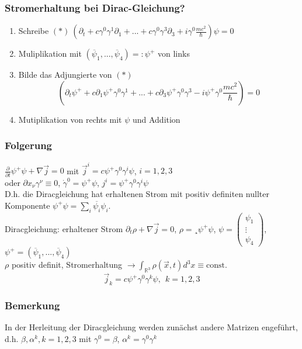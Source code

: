 \documentclass[twoside,a4paper]{scrartcl}
\newcommand{\R}{\mathbb{R}}
\renewcommand{\1}{\mathds{1}}
\newcommand{\ra}{\rightarrow}
\renewcommand{\R}{\mathbb{R}}
\begin{document}
\subsubsection*{Stromerhaltung bei Dirac-Gleichung?}
\begin{enumerate}
\item Schreibe $(*) \ (\partial_t+c\gamma^0\gamma^1 \partial_1+...+c\gamma^0\gamma^3 \partial_3+i\gamma^0\frac{mc^2}{\hbar})\psi=0$
\item Muliplikation mit $(\overline{\psi}_1,...,\overline{\psi}_4)=:\psi^+$ von links
\item Bilde das Adjungierte von $(*)$ 
$$(\partial_t \psi^++c\partial_1\psi^+\gamma^0\gamma^1 +...+c\partial_3\psi^+\gamma^0\gamma^3 -i\psi^+\gamma^0\frac{mc^2}{\hbar})=0$$
\item Mutiplikation von rechts mit $\psi$ und Addition
\end{enumerate}
\subsubsection*{Folgerung}
$\frac{\partial}{\partial t} \psi^+\psi+\nabla \vec j=0$ mit $\vec j^i=c \psi^+\gamma^0\gamma^i\psi$, $i=1,2,3$ \\
oder $\partial x_\nu \gamma^\nu\equiv 0$, $\dot \gamma^0=\psi^+\psi$, $j^i=\psi^+\gamma^0\gamma^i\psi$\\
D.h. die Diracgleichung hat erhaltenen Strom mit positiv definiten nullter Komponente $\psi^+\psi=\sum_i \overline{\psi_i}\psi_i$.\\
% 

Diracgleichung: erhaltener Strom $\partial_t\rho+\nabla \vec j=0$, $\rho=¸\psi^+\psi$, $\psi=\begin{pmatrix}\psi_1 \\ \vdots \\ \psi_4\end{pmatrix}$, $\psi^+=(\overline{\psi}_1,...,\overline{\psi}_4)$\\
$\rho$ positiv definit, Stromerhaltung $\ra \int_{\R^3} \rho(\vec x,t) d^3x\equiv \mathrm{const.}$
$$\vec j_k=c\psi^+ \gamma^0\gamma^k\psi, \ \ k=1,2,3$$
\subsubsection*{Bemerkung}
In der Herleitung der Diracgleichung werden zunächst andere Matrizen engeführt, d.h. $\beta,\alpha^k,k=1,2,3$ mit $\gamma^0=\beta$, $\alpha^k=\gamma^0\gamma^k$
\end{document}
